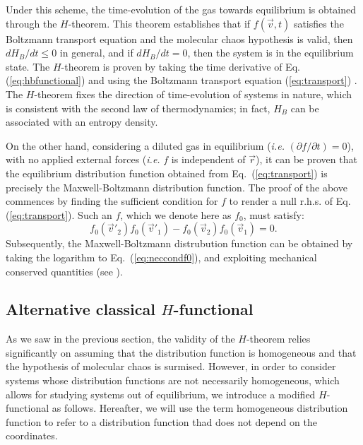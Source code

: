 Under this scheme, the time-evolution of the gas towards equilibrium is obtained through the
$H$-theorem. This theorem establishes that if $f(\vec{v},t)$ satisfies the Boltzmann
transport equation and the molecular chaos hypothesis is valid, then
$dH_B/dt\leq0$ in general, and if $dH_B/dt=0$, then the system is in the equilibrium state.
The $H$-theorem is proven by taking the time derivative
of Eq. (\ref{eq:hbfunctional}) and using the Boltzmann transport equation
(\ref{eq:transport}) \cite{bib:huang}. The $H$-theorem fixes the direction of time-evolution
of systems in nature, which is consistent with the second law of thermodynamics; in fact,
$H_B$ can be associated with an entropy density.

On the other hand, considering a diluted gas in equilibrium (\textit{i.e.}
$(\partial f/\partial t)=0$),
with no applied external forces (\textit{i.e.} $f$ is independent of $\vec r$), 
it can be proven that the equilibrium distribution function obtained from
Eq.~(\ref{eq:transport}) is precisely the Maxwell-Boltzmann
distribution function. The proof of the above commences by finding the sufficient
condition for $f$ to render a null r.h.s. of Eq. (\ref{eq:transport}). Such an
$f$, which we denote here as $f_0$, must satisfy:
%
\begin{equation}\label{eq:neccondf0}
    f_0(\vec{v}'_2)f_0(\vec{v}'_1)- f_0(\vec{v}_2)f_0(\vec{v}_1)=0.
\end{equation}
%
Subsequently, the Maxwell-Boltzmann distrubution function can be obtained by
taking the logarithm to Eq.~(\ref{eq:neccondf0}), and exploiting mechanical
conserved quantities (see \cite[ch. 4.2]{bib:huang}).

\subsection{Alternative classical $H$-functional}

As we saw in the previous section,
the validity of the $H$-theorem relies significantly on assuming
that the distribution function is homogeneous and that the hypothesis of
molecular chaos is surmised. However, in order to consider systems whose
distribution functions are not necessarily homogeneous, which
allows for studying systems out of equilibrium,
we introduce a modified $H$-functional as follows. Hereafter, we will
use the term homogeneous distribution function to refer to a distribution
function thad does not depend on the coordinates.

